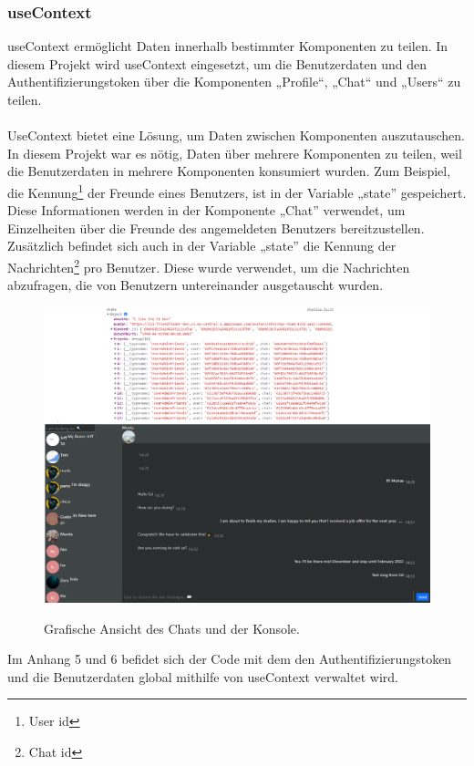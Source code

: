 \subsubsection*{useContext}
useContext ermöglicht Daten innerhalb bestimmter Komponenten zu teilen.
In diesem Projekt wird useContext eingesetzt, um die Benutzerdaten und den Authentifizierungstoken über die Komponenten  „Profile“, „Chat“ und „Users“ zu teilen.
\\\\
UseContext bietet eine Lösung, um Daten zwischen Komponenten auszutauschen.{\cite{R04}}
\\
In diesem Projekt war es nötig, Daten über mehrere Komponenten zu teilen, weil die Benutzerdaten in mehrere Komponenten konsumiert wurden.
Zum Beispiel, die Kennung\footnote{User id} der Freunde eines Benutzers, ist in der Variable „state” gespeichert. Diese Informationen werden in der Komponente „Chat” verwendet, um Einzelheiten über die Freunde des angemeldeten Benutzers bereitzustellen. Zusätzlich befindet sich auch in der Variable „state” die Kennung der Nachrichten\footnote{Chat id} pro Benutzer. Diese wurde verwendet, um die Nachrichten abzufragen, die von Benutzern untereinander ausgetauscht wurden.
\begin{figure}[h!]
  \centering
  \includegraphics[scale=0.45]{sources/Friends_in_Chat}
  \caption[Einzelheiten der Freunden]{}
  \label{fig:Friends_in_Chat} 
  Grafische Ansicht des Chats und der Konsole. 
\end{figure} 
Im Anhang 5 und 6 befidet sich der Code mit dem den Authentifizierungstoken und die Benutzerdaten global  mithilfe von useContext verwaltet wird.

